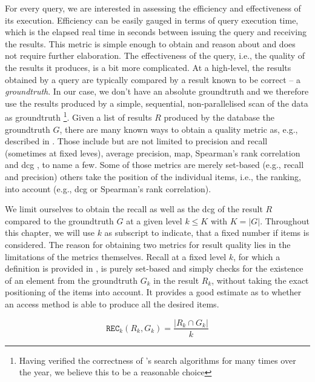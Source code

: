 For every query, we are interested in assessing the efficiency and effectiveness of its execution. Efficiency can be easily gauged in terms of query execution time, which is the elapsed real time in seconds between issuing the query and receiving the results. This metric is simple enough to obtain and reason about and does not require further elaboration. The effectiveness of the query, i.e., the quality of the results it produces, is a bit more complicated. At a high-level, the results obtained by a query are typically compared by a result known to be correct -- a \emph{groundtruth}. In our case, we don't have an absolute groundtruth and we therefore use the results produced by a simple, sequential, non-parallelised scan of the data as groundtruth \footnote{Having verified the correctness of \cottontail{}'s search algorithms for many times over the year, we believe this to be a reasonable choice}. Given a list of results $R$ produced by the database the groundtruth $G$, there are many known ways to obtain a quality metric as, e.g., described in \cite{Webber:2010Similarity}. Those include but are not limited to precision and recall (sometimes at fixed leves), average precision, \acrfull{map}, Spearman's rank correlation and \acrfull{dcg} \cite{Jarvelin:2002Cumulated}, to name a few. Some of those metrics are merely set-based (e.g., recall and precision) others take the position of the individual items, i.e., the ranking, into account (e.g., \acrshort{dcg} or Spearman's rank correlation).

We limit ourselves to obtain the recall as well as the \acrfull{dcg} \cite{Jarvelin:2002Cumulated} of the result $R$ compared to the groundtruth $G$ at a given level $k \leq K$ with $K = |G|$. Throughout this chapter, we will use $k$ as subscript to indicate, that a fixed number if items is considered. The reason for obtaining two metrics for result quality lies in the limitations of the metrics themselves. Recall at a fixed level $k$, for which a definition is provided in , is purely set-based and simply checks for the existence of an element from the groundtruth $G_k$ in the result $R_k$, without taking the exact positioning of the items into account. It provides a good estimate as to whether an access method is able to produce all the desired items.

\begin{equation}
    \label{equation:recall}
    \texttt{REC}_k (R_k, G_k) = \frac{|R_k \cap G_k |}{k}
\end{equation}

